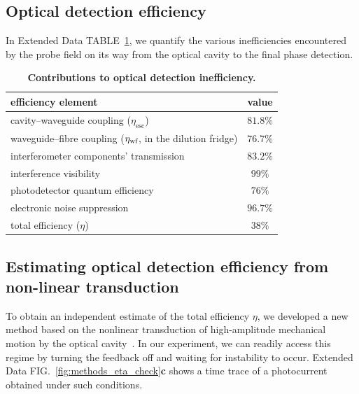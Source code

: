 \documentclass[./Main-revtex.tex]{subfiles}
\begin{document}
\subsection{Optical detection efficiency}
\label{sec:methods:total_losses}
In Extended Data TABLE~\ref{tab:methods:efficiency}, we quantify the various inefficiencies encountered by the probe field on its way from the optical cavity to the final phase detection.
\begin{table}[]
    \centering
    \begin{tabular}{l|c}
        efficiency element & value \\
        \hline
        cavity--waveguide coupling ($\eta_\text{esc}$) & $81.8\%$ \\
        waveguide--fibre coupling ($\eta_\text{wf}$, in the dilution fridge) & $76.7\%$ \\
        interferometer components' transmission & $83.2\%$ \\
        interference visibility & $99\%$ \\
        photodetector quantum efficiency & $76\%$ \\
        electronic noise suppression & $96.7\%$ \\
        \hline
        total efficiency ($\eta$) & $38\%$
    \end{tabular}
    \caption{\textbf{Contributions to optical detection inefficiency.}}
    \label{tab:methods:efficiency}
\end{table}

\subsection{Estimating optical detection efficiency from non-linear transduction}
\label{sec:methods:eta_check}
To obtain an independent estimate of the total efficiency $\eta$, we developed a new method based on the nonlinear transduction of high-amplitude mechanical motion by the optical cavity~\cite{leijssen2017nonlinear}. In our experiment, we can readily access this regime by turning the feedback off and waiting for instability to occur. Extended Data FIG.~\ref{fig:methods_eta_check}\textbf{c} shows a time trace of a photocurrent obtained under such conditions.
\end{document}
